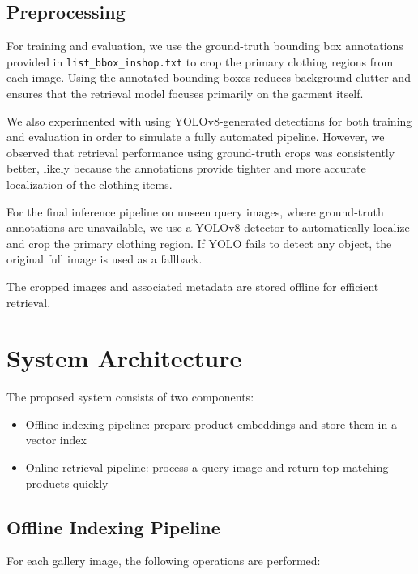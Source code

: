 \documentclass[12pt,a4paper]{article}
\begin{document}
\subsection{Preprocessing}

For training and evaluation, we use the ground-truth bounding box
annotations provided in \texttt{list\_bbox\_inshop.txt} to crop the
primary clothing regions from each image. Using the annotated bounding
boxes reduces background clutter and ensures that the retrieval model
focuses primarily on the garment itself.

We also experimented with using YOLOv8-generated detections for both
training and evaluation in order to simulate a fully automated pipeline.
However, we observed that retrieval performance using ground-truth crops
was consistently better, likely because the annotations provide tighter
and more accurate localization of the clothing items.

For the final inference pipeline on unseen query images, where
ground-truth annotations are unavailable, we use a YOLOv8 detector to
automatically localize and crop the primary clothing region. If YOLO
fails to detect any object, the original full image is used as a
fallback.

The cropped images and associated metadata are stored offline for
efficient retrieval.

\section{System Architecture}

The proposed system consists of two components:

\begin{itemize}[noitemsep]
    \item Offline indexing pipeline: prepare product embeddings and store them in a vector index
    \item Online retrieval pipeline: process a query image and return top matching products quickly
\end{itemize}

\subsection{Offline Indexing Pipeline}

For each gallery image, the following operations are performed:
\end{document}
